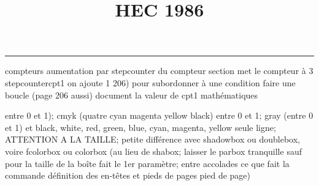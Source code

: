 \documentclass[11pt]{article}%
\title{\bf \vspace{-1cm} HEC 1986} %
\author{} %
\date{} %
\renewcommand{\headrulewidth}{0pt}%
\renewcommand{\footrulewidth}{0.4pt}%
\begin{document}
\maketitle %
\vspace{-1.2cm}\hrule %
\thispagestyle{fancy}

\vspace*{.4cm}


compteurs%
aumentation par stepcounter du compteur section%
met le compteur à 3%
stepcounter{cpt1} on ajoute 1%
206) pour subordonner à une condition %
faire une boucle (page 206 aussi) %
document la valeur de cpt1 
mathématiques\newcommand{\ch}{\operatorname{ch}} 
\newcommand{\sh}{\operatorname{sh}}
\renewcommand{\tanh}{\operatorname{th}}
\renewcommand{\sinh}{\operatorname{sh}}
\renewcommand{\cosh}{\operatorname{ch}}
\newcommand{\argsh}{\operatorname{argsh}}
\newcommand{\argch}{\operatorname{argch}}
\newcommand{\argth}{\operatorname{argth}}
\newcommand{\Id}{\operatorname{Id}}
\renewcommand{\leq}{\leq}
\renewcommand{\geq}{\geq }

\newcommand{\dlim}{\lim}
\newcommand{\dsum}{\sum}
\newcommand{\dprod}{\prod}



entre 0 et 1); cmyk (quatre cyan magenta yellow black) entre 0 et 1;
gray (entre 0 et 1) et black, white, red, green, blue, cyan, magenta,
yellow%
seule ligne; ATTENTION A LA TAILLE; petite différence avec shadowbox ou
doublebox, voire fcolorbox ou colorbox (au lieu de shabox; laisser le
parbox tranquille sauf pour la taille de la boîte
\newcommand{\Tbox}[1]{\begin{center} \shabox{\parbox{0.6
\linewidth}{#1}} \end{center}} %
fait le 1er paramètre; entre accolades ce que fait la commande
définition des en-têtes et pieds de pages\pagestyle{fancy}
\chead{}
\rfoot[ \ \thepage]{\thepage}
\cfoot{}
\lfoot{}
\thispagestyle{fancy} %
pied de page)\renewcommand{\footrulewidth}{0.4pt}
\renewcommand{\headrulewidth}{0.4pt}
\end{document}

